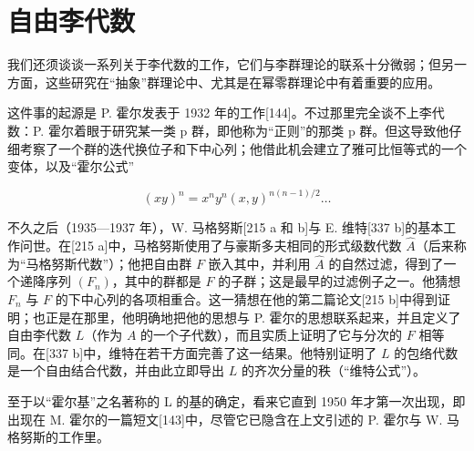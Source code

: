 \section{自由李代数}

我们还须谈谈一系列关于李代数的工作，它们与李群理论的联系十分微弱；但另一方面，这些研究在“抽象”群理论中、尤其是在幂零群理论中有着重要的应用。

这件事的起源是 P. 霍尔发表于 1932 年的工作{[}144{]}。不过那里完全谈不上李代数：P. 霍尔着眼于研究某一类 p 群，即他称为“正则”的那类 p 群。但这导致他仔细考察了一个群的迭代换位子和下中心列；他借此机会建立了雅可比恒等式的一个变体，以及“霍尔公式”

\[
(x y) ^ {n} = x ^ {n} y ^ {n} (x, y) ^ {n (n - 1) / 2} \dots
\]

不久之后（1935—1937 年），W. 马格努斯{[}215 a 和 b{]}与 E. 维特{[}337 b{]}的基本工作问世。在{[}215 a{]}中，马格努斯使用了与豪斯多夫相同的形式级数代数 \(\hat{A}\)（后来称为“马格努斯代数”）；他把自由群 \(F\) 嵌入其中，并利用 \(\hat{A}\) 的自然过滤，得到了一个递降序列 \((F_n)\)，其中的群都是 \(F\) 的子群；这是最早的过滤例子之一。他猜想 \(F_n\) 与 \(F\) 的下中心列的各项相重合。这一猜想在他的第二篇论文{[}215 b{]}中得到证明；也正是在那里，他明确地把他的思想与 P. 霍尔的思想联系起来，并且定义了自由李代数 \(L\)（作为 \(A\) 的一个子代数），而且实质上证明了它与分次的 \(F\) 相等同。在{[}337 b{]}中，维特在若干方面完善了这一结果。他特别证明了 \(L\) 的包络代数是一个自由结合代数，并由此立即导出 \(L\) 的齐次分量的秩（“维特公式”）。

至于以“霍尔基”之名著称的 L 的基的确定，看来它直到 1950 年才第一次出现，即出现在 M. 霍尔的一篇短文{[}143{]}中，尽管它已隐含在上文引述的 P. 霍尔与 W. 马格努斯的工作里。

